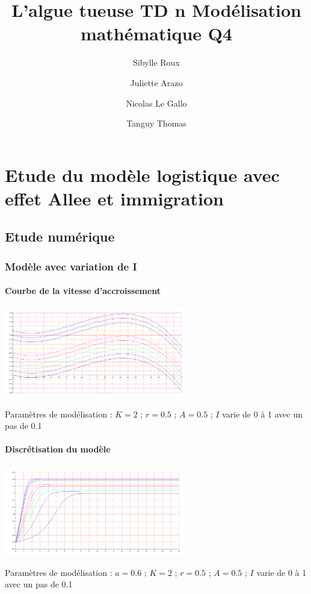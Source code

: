 \documentclass{article}
\begin{document}
\title{L'algue tueuse
	\smallbreak
	TD n
	\smallbreak
	Modélisation mathématique
	\smallbreak
	Q4}
\author{Sibylle Roux \and Juliette Arazo \and Nicolas Le Gallo \and Tanguy Thomas}


\maketitle

\newpage

\tableofcontents

\newpage

\section{Etude du modèle logistique avec effet Allee et immigration}

\subsection{Etude numérique}

\subsubsection{Modèle avec variation de I}

\paragraph{Courbe de la vitesse d'accroissement}
\begin{center}
\includegraphics[width=300px]{img/part1/AlleeI.png}
\end{center}
Paramètres de modélisation : $K=2$  ; $r=0.5$ ; $A=0.5$ ; $I$ varie de 0 à 1 avec un pas de 0.1 
\paragraph{}

\newpage

\paragraph{Discrétisation du modèle}
\begin{center}
\includegraphics[width=300px]{img/part1/TrajI.png}
\end{center}
Paramètres de modélisation : $a=0.6$ ; $K=2$  ; $r=0.5$ ; $A=0.5$ ; $I$ varie de 0 à 1 avec un pas de 0.1
\end{document}
